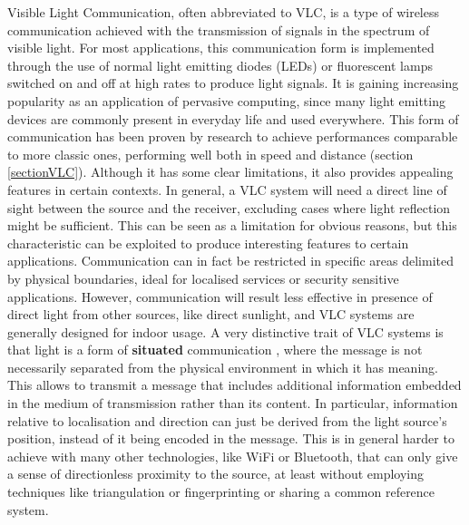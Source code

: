 

Visible Light Communication, often abbreviated to VLC, is a type of wireless communication achieved with the transmission of signals in the spectrum of visible light.
For most applications, this communication form is implemented through the use of  normal light emitting diodes (LEDs) or fluorescent lamps switched on and off at high rates to produce light signals.
It is gaining increasing popularity as an application of pervasive computing, since many light emitting devices are commonly present in everyday life and used everywhere.
This form of communication has been proven by research to achieve performances comparable to more classic ones, performing well both in speed and distance (section \ref{sectionVLC}).
Although it has some clear limitations, it also provides appealing features in certain contexts.
In general, a VLC system will need a direct line of sight between the source and the receiver, excluding cases where light reflection might be sufficient.
This can be seen as a limitation for obvious reasons, but this characteristic can be exploited to produce interesting features to certain applications.
Communication can in fact be restricted in specific areas delimited by physical boundaries, ideal for localised services or security sensitive applications.
However, communication will result less effective in presence of direct light from other sources, like direct sunlight, and VLC systems are generally designed for indoor usage.
\newline
A very distinctive trait of VLC systems is that light is a form of \textbf{situated} communication \cite{kasper}, where the message is not necessarily separated from the physical environment in which it has meaning.
This allows to transmit a message that includes additional information embedded in the medium of transmission rather than its content.
In particular, information relative to localisation and direction can just be derived from the light source's position, instead of it being encoded in the message.
This is in general harder to achieve with many other technologies, like WiFi or Bluetooth, that can only give a sense of directionless proximity to the source, at least without employing techniques like triangulation or fingerprinting or sharing a common reference system.
